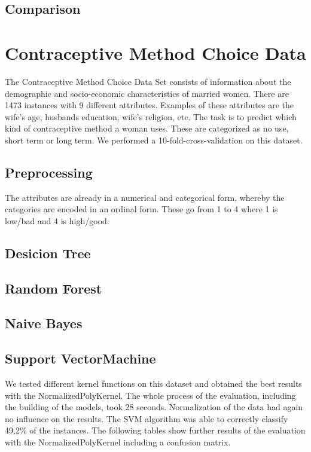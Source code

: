 \documentclass[paper=a4, fontsize=11pt]{scrartcl} %
\numberwithin{equation}{section} %
\numberwithin{figure}{section} %
\numberwithin{table}{section} %
\begin{document}
\subsection{Comparison}




\section{Contraceptive Method Choice Data}

The Contraceptive Method Choice Data Set consists of information about the demographic and socio-economic characteristics of married women. There are 1473 instances with 9 different attributes. Examples of these attributes are the wife's age, husbands education, wife's religion, etc. The task is to predict which kind of contraceptive method a woman uses. These are categorized as no use, short term or long term. We performed a 10-fold-cross-validation on this dataset.

\subsection{Preprocessing}

The attributes are already in a numerical and categorical form, whereby the categories are encoded in an ordinal form. These go from 1 to 4 where 1 is low/bad and 4 is high/good.



\subsection{Desicion Tree}
\subsection{Random Forest}
\subsection{Naive Bayes}
\subsection{Support VectorMachine}

We tested different kernel functions on this dataset and obtained the best results with the NormalizedPolyKernel. The whole process of the evaluation, including the building of the models, took 28 seconds. Normalization of the data had again no influence on the results. The SVM algorithm was able to correctly classify 49,2\% of the instances. The following tables show further results of the evaluation with the NormalizedPolyKernel including a confusion matrix.
\end{document}
